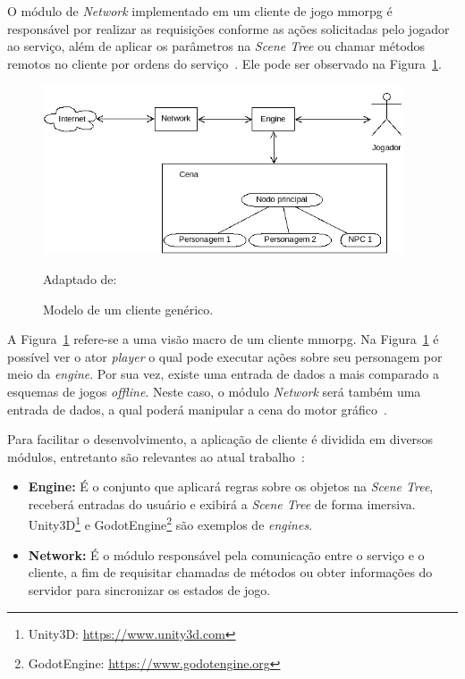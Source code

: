 O módulo de \textit{Network} implementado em um cliente de jogo \ac{mmorpg} é responsável por realizar as requisições conforme as ações solicitadas pelo jogador ao serviço, além de aplicar os parâmetros na \textit{Scene Tree} ou chamar métodos remotos no cliente por ordens do serviço~\cite{albion_online_unite}.
%
Ele pode ser observado na Figura~\ref{fig:gateway}.


\begin{figure}[htb!]
\caption{Modelo de um cliente genérico.}
\label{fig:gateway}
\includegraphics[height=5cm]{img/cap2/cliente.png}
\centering

Adaptado de:~\cite{507915, faber}
\end{figure}


A Figura~\ref{fig:gateway} refere-se a uma visão macro de um cliente \ac{mmorpg}.
%
Na Figura~\ref{fig:gateway} é possível ver o ator \textit{player} o qual pode executar ações sobre seu personagem por meio da \textit{engine}.
%
Por sua vez, existe uma entrada de dados a mais comparado a esquemas de jogos \textit{offline}.
%
Neste caso, o módulo \textit{Network} será também uma entrada de dados, a qual poderá manipular a cena do motor gráfico~\cite{faber}.



Para facilitar o desenvolvimento, a aplicação de cliente é dividida em diversos módulos, entretanto são relevantes ao atual trabalho~\cite{albion_online_unite}:



\begin{itemize}
  \item \textbf{Engine:} É o conjunto que aplicará regras sobre os objetos na \textit{Scene Tree}, receberá entradas do usuário e exibirá a \textit{Scene Tree} de forma imersiva. Unity3D\footnote{Unity3D: \url{https://www.unity3d.com}} e GodotEngine\footnote{GodotEngine: \url{https://www.godotengine.org}} são exemplos de \textit{engines}.
  \item \textbf{Network:} É o módulo responsável pela comunicação entre o serviço e o cliente, a fim de requisitar chamadas de métodos ou obter informações do servidor para sincronizar os estados de jogo.
\end{itemize}




